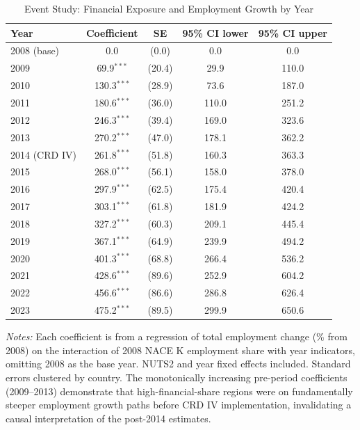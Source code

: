 \begin{table}[t]
\centering
\caption{Event Study: Financial Exposure and Employment Growth by Year}
\label{tab:eventstudy}
\begin{threeparttable}
\begin{tabular}{lcccc}
\toprule
Year & Coefficient & SE & 95\% CI lower & 95\% CI upper \\
\midrule
2008 (base) & 0.0 & (0.0) & 0.0 & 0.0 \\
2009 & 69.9$^{***}$ & (20.4) & 29.9 & 110.0 \\
2010 & 130.3$^{***}$ & (28.9) & 73.6 & 187.0 \\
2011 & 180.6$^{***}$ & (36.0) & 110.0 & 251.2 \\
2012 & 246.3$^{***}$ & (39.4) & 169.0 & 323.6 \\
2013 & 270.2$^{***}$ & (47.0) & 178.1 & 362.2 \\
2014 (CRD IV) & 261.8$^{***}$ & (51.8) & 160.3 & 363.3 \\
2015 & 268.0$^{***}$ & (56.1) & 158.0 & 378.0 \\
2016 & 297.9$^{***}$ & (62.5) & 175.4 & 420.4 \\
2017 & 303.1$^{***}$ & (61.8) & 181.9 & 424.2 \\
2018 & 327.2$^{***}$ & (60.3) & 209.1 & 445.4 \\
2019 & 367.1$^{***}$ & (64.9) & 239.9 & 494.2 \\
2020 & 401.3$^{***}$ & (68.8) & 266.4 & 536.2 \\
2021 & 428.6$^{***}$ & (89.6) & 252.9 & 604.2 \\
2022 & 456.6$^{***}$ & (86.6) & 286.8 & 626.4 \\
2023 & 475.2$^{***}$ & (89.5) & 299.9 & 650.6 \\
\bottomrule
\end{tabular}
\begin{tablenotes}[flushleft]\footnotesize\raggedright
\item \textit{Notes:} Each coefficient is from a regression of total employment change (\% from 2008) on the interaction of 2008 NACE K employment share with year indicators, omitting 2008 as the base year. NUTS2 and year fixed effects included. Standard errors clustered by country. The monotonically increasing pre-period coefficients (2009--2013) demonstrate that high-financial-share regions were on fundamentally steeper employment growth paths before CRD IV implementation, invalidating a causal interpretation of the post-2014 estimates.
\end{tablenotes}
\end{threeparttable}
\end{table}


